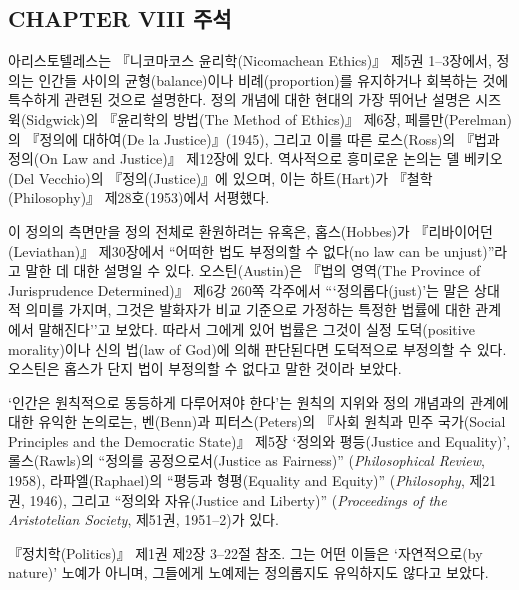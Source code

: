 {\footnotesize

\subsection{CHAPTER VIII 주석}\label{chapter-viii-uxc8fcuxc11d}

아리스토텔레스는 『니코마코스 윤리학(Nicomachean Ethics)』 제5권
1--3장에서, 정의는 인간들 사이의 균형(balance)이나 비례(proportion)를
유지하거나 회복하는 것에 특수하게 관련된 것으로 설명한다. 정의 개념에
대한 현대의 가장 뛰어난 설명은 시즈윅(Sidgwick)의 『윤리학의 방법(The
Method of Ethics)』 제6장, 페를만(Perelman)의 『정의에 대하여(De la
Justice)』(1945), 그리고 이를 따른 로스(Ross)의 『법과 정의(On Law and
Justice)』 제12장에 있다. 역사적으로 흥미로운 논의는 델 베키오(Del
Vecchio)의 『정의(Justice)』에 있으며, 이는 하트(Hart)가
『철학(Philosophy)』 제28호(1953)에서 서평했다.

 이 정의의 측면만을 정의 전체로
환원하려는 유혹은, 홉스(Hobbes)가 『리바이어던(Leviathan)』 제30장에서
``어떠한 법도 부정의할 수 없다(no law can be unjust)''라고 말한 데 대한
설명일 수 있다. 오스틴(Austin)은 『법의 영역(The Province of
Jurisprudence Determined)』 제6강 260쪽 각주에서 ```정의롭다(just)'는
말은 상대적 의미를 가지며, 그것은 발화자가 비교 기준으로 가정하는 특정한
법률에 대한 관계에서 말해진다''고 보았다. 따라서 그에게 있어 법률은
그것이 실정 도덕(positive morality)이나 신의 법(law of God)에 의해
판단된다면 도덕적으로 부정의할 수 있다. 오스틴은 홉스가 단지 법이
 부정의할 수 없다고 말한 것이라 보았다.

 `인간은 원칙적으로 동등하게
다루어져야 한다'는 원칙의 지위와 정의 개념과의 관계에 대한 유익한
논의로는, 벤(Benn)과 피터스(Peters)의 『사회 원칙과 민주 국가(Social
Principles and the Democratic State)』 제5장 `정의와 평등(Justice and
Equality)', 롤스(Rawls)의 ``정의를 공정으로서(Justice as Fairness)''
(\emph{Philosophical Review}, 1958), 라파엘(Raphael)의 ``평등과
형평(Equality and Equity)'' (\emph{Philosophy}, 제21권, 1946), 그리고
``정의와 자유(Justice and Liberty)'' (\emph{Proceedings of the
Aristotelian Society}, 제51권, 1951--2)가 있다.

 『정치학(Politics)』 제1권 제2장
3--22절 참조. 그는 어떤 이들은 `자연적으로(by nature)' 노예가 아니며,
그들에게 노예제는 정의롭지도 유익하지도 않다고 보았다.

}
